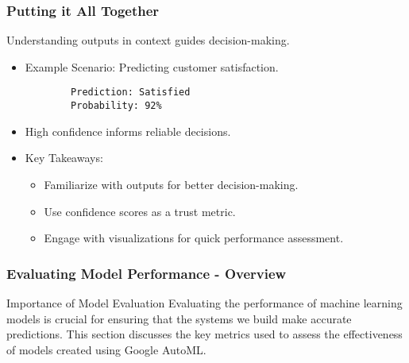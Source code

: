 \documentclass[aspectratio=169]{beamer}
\begin{document}
\begin{frame}[fragile]
    \frametitle{Putting it All Together}
    Understanding outputs in context guides decision-making.
    \begin{itemize}
        \item Example Scenario: Predicting customer satisfaction.
        \begin{lstlisting}
        Prediction: Satisfied
        Probability: 92%
        \end{lstlisting}
        \item High confidence informs reliable decisions.
        \item Key Takeaways:
        \begin{itemize}
            \item Familiarize with outputs for better decision-making.
            \item Use confidence scores as a trust metric.
            \item Engage with visualizations for quick performance assessment.
        \end{itemize}
    \end{itemize}
\end{frame}

\begin{frame}[fragile]
    \frametitle{Evaluating Model Performance - Overview}
    \begin{block}{Importance of Model Evaluation}
        Evaluating the performance of machine learning models is crucial for ensuring that the systems we build make accurate predictions. This section discusses the key metrics used to assess the effectiveness of models created using Google AutoML.
    \end{block}
\end{frame}
\end{document}
